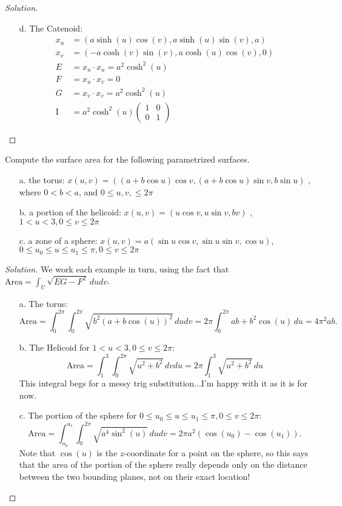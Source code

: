 \documentclass[Shifrin_Solutions_Spring_2015]{subfiles}
\begin{document}
\begin{proof}[Solution]
\begin{itemize}
\item[d.] The Catenoid:
\begin{align*}
x_u & = \left( a\sinh(u)\cos(v), a\sinh(u)\sin(v), a \right) \\
x_v & = \left( -a\cosh(v)\sin(v), a\cosh(u)\cos(v), 0\right) \\
E & = x_u\cdot x_u = a^2 \cosh^2(u) \\
F & = x_u\cdot x_v = 0 \\
G & = x_v\cdot x_v =  a^2 \cosh^2(u)  \\
\mathrm{I} &= a^2 \cosh^2(u)  \begin{pmatrix} 1 & 0 \\ 0 &  1 \end{pmatrix}
\end{align*}
\end{itemize}
\end{proof}

\begin{exercise}
Compute the surface area for the following parametrized surfaces.
\begin{itemize}
\item[a.] the torus: $x(u,v) = ( (a+b\cos u) \cos v , (a + b \cos u) \sin v , b \sin u )$ , where $0<b < a$, and  $ 0 \leq u, v, \leq 2\pi$
\item[b.] a portion of the helicoid:  $x(u,v) = (u \cos v , u \sin v, bv )$ , $1< u < 3, 0\leq v \leq 2\pi$
\item[c.] a zone of a sphere: $x(u,v) = a (\sin u \cos v , \sin u \sin v , \cos u )$, $0\leq u_0 \leq u \leq u_1 \leq \pi, 0 \leq v \leq 2\pi$
\end{itemize}
\end{exercise}

\begin{proof}[Solution] We work each example in turn, using the fact that $\mathrm{Area} = \int_U \sqrt{EG-F^2}\, dudv$.
\begin{itemize}
\item[a.] The torus:
\[
\mathrm{Area} = \int_0^{2\pi}\int_0^{2\pi} \sqrt{b^2(a+b\cos(u))^2} \, dudv =2\pi \int_0^{2\pi} ab + b^2\cos(u) \, du = 4\pi^2 a b.
\]
\item[b.] The Helicoid for $1<u<3, 0\leq v \leq 2\pi$:
\[
\mathrm{Area} = \int_1^3\int_0^{2\pi}\sqrt{u^2+b^2} \, dvdu = 2\pi \int_1^3 \sqrt{u^2+b^2} \, du
\]
This integral begs for a messy trig substitution...I'm happy with it as it is for now.

\item[c.] The portion of the sphere for $0\leq u_0 \leq u \leq u_1 \leq \pi, 0 \leq v \leq 2\pi$:
\[
\mathrm{Area} = \int_{u_0}^{u_1} \int_0^{2\pi} \sqrt{a^4\sin^2(u)}\, dudv = 2\pi a^2 \left( \cos(u_0) - \cos(u_1) \right).
\]
Note that $\cos(u)$ is the $z$-coordinate for a point on the sphere, so this says that the area of the portion of the sphere really depends only on the distance between the two bounding planes, not on their exact location!
\end{itemize}
\end{proof}
\end{document}
